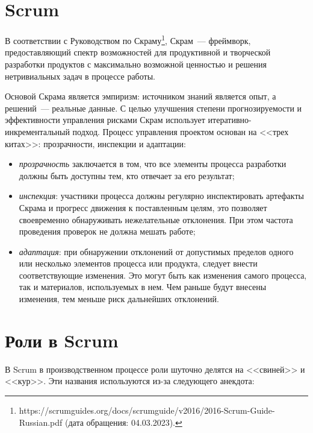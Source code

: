 \documentclass{../../text-style}
\begin{document}
\maketitle
\thispagestyle{empty}


\section{Scrum}

В соответствии с Руководством по Скраму\footnote{https://scrumguides.org/docs/scrumguide/v2016/2016-Scrum-Guide-Russian.pdf (дата обращения: 04.03.2023).}, Скрам~--- фреймворк, предоставляющий спектр возможностей для продуктивной и творческой разработки продуктов с максимально возможной ценностью и решения нетривиальных задач в процессе работы.

Основой Скрама является эмпиризм: источником знаний является опыт, а решений~--- реальные данные. С целью улучшения степени прогнозируемости и эффективности управления рисками Скрам использует итеративно-инкрементальный подход. Процесс управления проектом основан на <<трех китах>>: прозрачности, инспекции и адаптации:

\begin{itemize}
    \item \emph{прозрачность} заключается в том, что все элементы процесса разработки должны быть доступны тем, кто отвечает за его результат;
    \item \emph{инспекция}: участники процесса должны регулярно инспектировать артефакты Скрама и прогресс движения к поставленным целям, это позволяет своевременно обнаруживать нежелательные отклонения. При этом частота проведения проверок не должна мешать работе;
    \item \emph{адаптация}: при обнаружении отклонений от допустимых пределов одного или несколько элементов процесса или продукта, следует внести соответствующие изменения. Это могут быть как изменения самого процесса, так и материалов, используемых в нем. Чем раньше будут внесены изменения, тем меньше риск дальнейших отклонений.
\end{itemize}

\section{Роли в Scrum}

В Scrum в производственном процессе роли шуточно делятся на <<свиней>> и <<кур>>. Эти названия используются из-за следующего анекдота:
\end{document}
